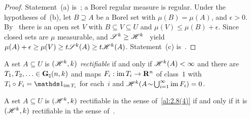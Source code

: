 \begin{proof}
    Statement~(a) is~\cite[2.10.19(1)]{Federer1969}; a Borel regular measure is regular. Under
    the hypotheses of~(b), let $B \supseteq A$ be a Borel set with $\mu(B) = \mu(A)$, and $\epsilon
    > 0$. By~\cite[2.2.2(2), 2.2.3]{Federer1969} there is an open set $V$ with $B \subseteq V
    \subseteq U$ and $\mu(V) \le \mu(B) + \epsilon$. Since closed sets are $\mu$ measurable,
    \cite[2.10.19(3)]{Federer1969} and $\mathscr{S}^{k} \ge \mathscr{H}^{k}$~\cite[2.10.6]{Federer1969}
    yield $\mu(A) + \epsilon \ge \mu(V) \ge t \mathscr{S}^{k}(A) \ge t \mathscr{H}^{k}(A)$.
    Statement~(c) is~\cite[2.10.19(4)]{Federer1969}.
\end{proof}

\begin{definition}
    \label{al:2.8(4)}
    A set $A \subseteq U$ is \emph{$(\mathscr{H}^{k},k)$ rectifiable} if and only if
    $\mathscr{H}^{k}(A) < \infty$ and there are $T_1, T_2, \ldots \in \mathbf{G}_{\natural}(n,k)$ and maps
    $F_i : \operatorname{im} T_i \to \mathbf{R}^{n}$ of class~$1$ with $T_i \circ F_i = \id{\im T_i}$ for each~$i$
    and $\mathscr{H}^{k}(A \!\sim\! {{\textstyle \bigcup}}_{i=1}^\infty \operatorname{im} F_i) = 0$.
\end{definition}

\begin{lemma}[new\MS]
    \label{new:rectifiable_equiv}
    A set $A \subseteq U$ is $(\mathscr{H}^{k},k)$ rectifiable in the sense of~\ref{al:2.8(4)}
    if and only if it is $(\mathscr{H}^{k},k)$ rectifiable in the sense
    of~\cite[3.2.14]{Federer1969}.
\end{lemma}

